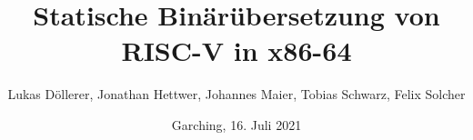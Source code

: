 %
%
%
%





\newcommand{\Datum}{\today}

\renewcommand{\PraesentationFusszeileZusatz}{Rechnerarchitektur-Großpraktikum 2021 | Statische Binärübersetzung von RISC-V in x86-64}

\title{Statische Binärübersetzung von RISC-V in x86-64}
\author{Lukas Döllerer, Jonathan Hettwer, Johannes Maier, Tobias Schwarz, Felix Solcher}
\date[\Datum]{Garching, 16. Juli 2021}
\subject{Statische Binärübersetzung von RISC-V in x86-64}




\PraesentationMasterStandard

\PraesentationTitelseite %




